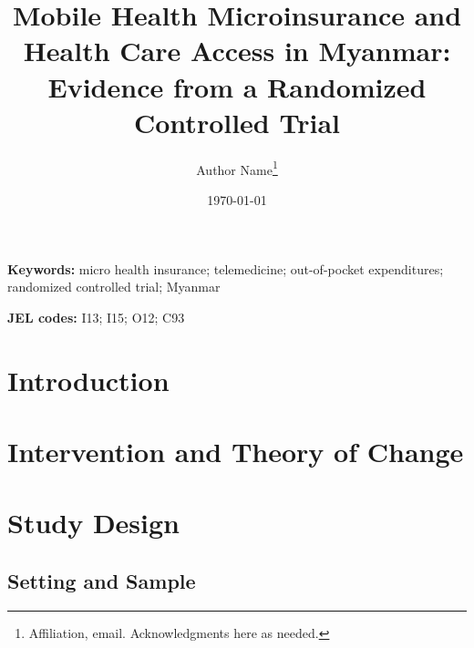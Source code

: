 \documentclass[12pt]{article}
\title{Mobile Health Microinsurance and Health Care Access in Myanmar: \\
Evidence from a Randomized Controlled Trial}
\author{Author Name\thanks{Affiliation, email. Acknowledgments here as needed.}}
\date{\today}
\begin{document}
\maketitle
\thispagestyle{empty}

\begin{abstract}
\end{abstract}

\noindent\textbf{Keywords:} micro health insurance; telemedicine; out-of-pocket expenditures; randomized controlled trial; Myanmar

\noindent\textbf{JEL codes:} I13; I15; O12; C93

\newpage
\setcounter{page}{1}
\onehalfspacing

\section{Introduction}

\section{Intervention and Theory of Change}

\section{Study Design}
\subsection{Setting and Sample}
\end{document}
